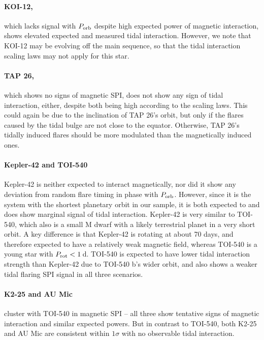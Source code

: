\documentclass[twocolumn]{aastex631}
\begin{document}
\paragraph{KOI-12,} which lacks signal with $P_{\rm orb}$ despite high expected power of magnetic interaction, shows elevated expected and measured tidal interaction. However, we note that KOI-12 may be evolving off the main sequence, so that the tidal interaction scaling laws may not apply for this star. 

\paragraph{TAP 26,} which shows no signs of magnetic SPI, does not show any sign of tidal interaction, either, despite both being high according to the scaling laws. This could again be due to the inclination of TAP 26's orbit, but only if the flares caused by the tidal bulge are not close to the equator. Otherwise, TAP 26's tidally induced flares should be more modulated than the magnetically induced ones. 

\paragraph{Kepler-42 and TOI-540} Kepler-42 is neither expected to interact magnetically, nor did it show any deviation from random flare timing in phase with $P_{\rm orb}$. However, since it is the system with the shortest planetary orbit in our sample, it is both expected to and does show marginal signal of tidal interaction. Kepler-42 is very similar to TOI-540, which also is a small M dwarf with a likely terrestrial planet in a very short orbit. A key difference is that Kepler-42 is rotating at about 70 days, and therefore expected to have a relatively weak magnetic field, whereas TOI-540 is a young star with $P_{\rm rot}<1\,$d. TOI-540 is expected to have lower tidal interaction strength than Kepler-42 due to TOI-540 b's wider orbit, and also shows a weaker tidal flaring SPI signal in all three scenarios. 

\paragraph{K2-25 and AU Mic} cluster with TOI-540 in magnetic SPI -- all three show tentative signs of magnetic interaction and similar expected powers. But in contrast to TOI-540, both K2-25 and AU Mic are consistent within $1\sigma$ with no observable tidal interaction.
\end{document}
